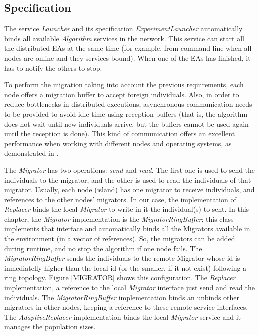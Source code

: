 \subsection{Specification}

The service {\em Launcher} and its specification {\em ExperimentLauncher} automatically binds all available {\em Algorithm} services in the network. This service can start all the distributed EAs at the same time (for example, from command line when all nodes are online and they services bound). When one of the EAs has finished, it has to notify the others to stop. 

To perform the migration taking into account the previous requirements, each node offers a migration buffer to
accept foreign individuals. Also, in order to reduce bottlenecks in
distributed executions, asynchronous communication needs to  be provided
to avoid idle time using reception buffers (that is, the algorithm
does not wait until new individuals arrive, but the buffers cannot be
used again until the reception is done). This kind of communication
offers an excellent performance when working with different nodes and
operating systems, as demonstrated in \cite{AsynchronousMerelo08}.

The {\em Migrator}  has two operations: {\em send} and {\em read}. The first one is used to send the individuals to the migrator, and the other is used to read the individuals of that migrator. Usually, each node (island) has one migrator to receive individuals, and references to the other nodes' migrators. In our case, the implementation of {\em Replacer} binds the local {\em Migrator} to write in it the individual(s) to sent. In this chapter, the {\em Migrator} implementation is the {\em MigratorRingBuffer}: this class implements that interface and automatically binds all the Migrators available in the environment (in a vector of references). So, the migrators can be added during runtime, and no stop the algorithm if one node fails.  The {\em MigratorRingBuffer} sends the individuals to the remote Migrator whose id is inmediatelly higher than the local id (or the smaller, if it not exist) following a ring topology. Figure \ref{MIGRATOR} shows this configuration. The {\em Replacer} implementation, a reference to the local {\em Migrator} interface just send and read the individuals. The {\em MigratorRingBuffer} implementation binds an unbinds other migrators in other nodes, keeping a reference to these remote service interfaces. The {\em AdaptiveReplacer} implementation binds the local {\em Migrator} service and it manages the population sizes.





